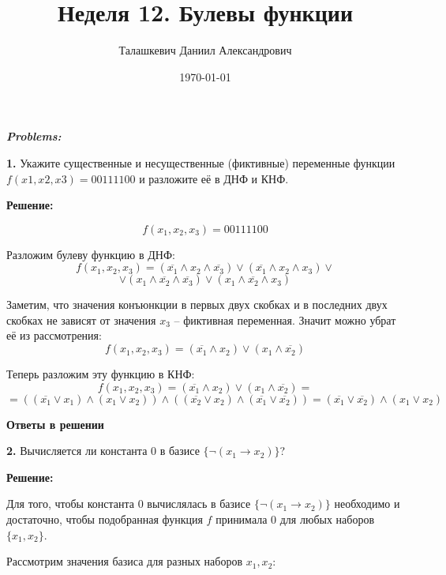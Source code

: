 \documentclass[a4paper,12pt]{article} %
\author{Талашкевич Даниил Александрович}
\title{Неделя 12. Булевы функции}
\date{\today}
\begin{document}
\maketitle
\thispagestyle{empty}

\newpage
\setcounter{page}{1}
\begin{center}
\itshape
\bfseries
{ \Large Problems:}
\end{center}

{\bf 1.} Укажите существенные и несущественные (фиктивные) переменные
функции $f(x1, x2, x3) = 00111100$ и разложите её в ДНФ и КНФ.
\begin{center}
\bfseries
{\Large Решение: }
\end{center}
\[f(x_1,x_2,x_3) = 00111100\]

Разложим булеву функцию в ДНФ:
\[f(x_1,x_2,x_3) = (\overline{x_1} \wedge x_2 \wedge \overline{x_3})\vee (\overline{x_1} \wedge x_2 \wedge x_3) \vee\]
\[\vee (x_1 \wedge \overline{x_2} \wedge \overline{x_3}) \vee (x_1 \wedge \overline{x_2} \wedge x_3)\]

Заметим, что значения конъюнкции в первых двух скобках и в последних двух скобках не зависят от значения $x_3$ -- фиктивная переменная. Значит можно убрат её из рассмотрения:
\[f(x_1,x_2,x_3) = (\overline{x_1} \wedge x_2)\vee (x_1 \wedge \overline{x_2})\]

Теперь разложим эту функцию в КНФ:
\[f(x_1,x_2,x_3) = (\overline{x_1} \wedge x_2)\vee (x_1 \wedge \overline{x_2}) = \]
\[= ((\overline{x_1} \vee x_1) \wedge (x_1 \vee x_2))\wedge ((\overline{x_2} \vee x_2) \wedge (\overline{x_1} \vee \overline{x_2})) = (\overline{x_1} \vee \overline{x_2}) \wedge (x_1 \vee x_2) \]


\begin{flushright}
\begin{large}
\textbf {Ответы в решении}
\end{large}
\end{flushright}

{\bf 2.} Вычисляется ли константа $0$ в базисе $\{ \neg(x_1 \rightarrow x_2) \}$?
\begin{center}
\bfseries
{\Large Решение: }
\end{center}

Для того, чтобы константа $0$ вычислялась в базисе $\{ \neg(x_1 \rightarrow x_2) \}$ необходимо и достаточно, чтобы подобранная функция $f$ принимала $0$ для любых наборов $\{x_1,x_2\}$.

Рассмотрим значения базиса для разных наборов $x_1, x_2$:
\end{document}
